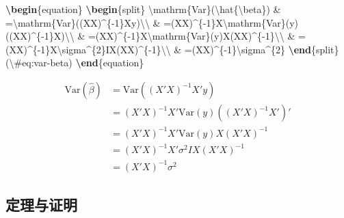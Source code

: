 \documentclass[
  12pt,
]{krantz}
\newenvironment{Shaded}{\begin{snugshade}}{\end{snugshade}}
\newcommand{\ExtensionTok}[1]{#1}
\newcommand{\KeywordTok}[1]{\textcolor[rgb]{0.13,0.29,0.53}{\textbf{#1}}}
\newcommand{\NormalTok}[1]{#1}
\newcommand{\SpecialCharTok}[1]{\textcolor[rgb]{0.00,0.00,0.00}{#1}}
\newcommand{\SpecialStringTok}[1]{\textcolor[rgb]{0.31,0.60,0.02}{#1}}
\theoremstyle{definition}
\theoremstyle{definition}
\theoremstyle{definition}
\theoremstyle{definition}
\theoremstyle{remark}
\begin{document}
\begin{Shaded}
\begin{Highlighting}[]
\KeywordTok{\textbackslash{}begin}\NormalTok{\{}\ExtensionTok{equation}\NormalTok{\}}\SpecialStringTok{ }
\KeywordTok{\textbackslash{}begin}\NormalTok{\{}\ExtensionTok{split}\NormalTok{\}}
\SpecialCharTok{\textbackslash{}mathrm}\SpecialStringTok{\{Var\}(}\SpecialCharTok{\textbackslash{}hat}\SpecialStringTok{\{}\SpecialCharTok{\textbackslash{}beta}\SpecialStringTok{\}) \& =}\SpecialCharTok{\textbackslash{}mathrm}\SpecialStringTok{\{Var\}((X\textquotesingle{}X)\^{}\{{-}1\}X\textquotesingle{}y)}\SpecialCharTok{\textbackslash{}\textbackslash{}}
\SpecialStringTok{ \& =(X\textquotesingle{}X)\^{}\{{-}1\}X\textquotesingle{}}\SpecialCharTok{\textbackslash{}mathrm}\SpecialStringTok{\{Var\}(y)((X\textquotesingle{}X)\^{}\{{-}1\}X\textquotesingle{})\textquotesingle{}}\SpecialCharTok{\textbackslash{}\textbackslash{}}
\SpecialStringTok{ \& =(X\textquotesingle{}X)\^{}\{{-}1\}X\textquotesingle{}}\SpecialCharTok{\textbackslash{}mathrm}\SpecialStringTok{\{Var\}(y)X(X\textquotesingle{}X)\^{}\{{-}1\}}\SpecialCharTok{\textbackslash{}\textbackslash{}}
\SpecialStringTok{ \& =(X\textquotesingle{}X)\^{}\{{-}1\}X\textquotesingle{}}\SpecialCharTok{\textbackslash{}sigma}\SpecialStringTok{\^{}\{2\}IX(X\textquotesingle{}X)\^{}\{{-}1\}}\SpecialCharTok{\textbackslash{}\textbackslash{}}
\SpecialStringTok{ \& =(X\textquotesingle{}X)\^{}\{{-}1\}}\SpecialCharTok{\textbackslash{}sigma}\SpecialStringTok{\^{}\{2\}}
\KeywordTok{\textbackslash{}end}\NormalTok{\{}\ExtensionTok{split}\NormalTok{\}}
\SpecialStringTok{(}\SpecialCharTok{\textbackslash{}\#}\SpecialStringTok{eq:var{-}beta)}
\KeywordTok{\textbackslash{}end}\NormalTok{\{}\ExtensionTok{equation}\NormalTok{\} }
\end{Highlighting}
\end{Shaded}

\begin{equation}
\begin{split}
\mathrm{Var}(\hat{\beta}) & =\mathrm{Var}((X'X)^{-1}X'y)\\
 & =(X'X)^{-1}X'\mathrm{Var}(y)((X'X)^{-1}X')'\\
 & =(X'X)^{-1}X'\mathrm{Var}(y)X(X'X)^{-1}\\
 & =(X'X)^{-1}X'\sigma^{2}IX(X'X)^{-1}\\
 & =(X'X)^{-1}\sigma^{2}
\end{split}
\label{eq:var-beta}
\end{equation}

\hypertarget{theorems}{%
\subsection{定理与证明}\label{theorems}}
\end{document}
